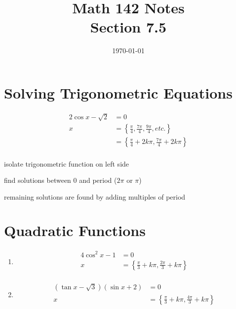 \documentclass{exam}
\title{Math 142 Notes \\ Section 7.5}
\date{\today}
\begin{document}
  \maketitle
  \tableofcontents

  \section{Solving Trigonometric Equations}
  \begin{align*}
    2 \cos x - \sqrt{2} & = 0 \\
    x                   & = \left\{ \frac{\pi}{4}, \frac{7\pi}{4}, \frac{9\pi}{4}, etc. \right\} \\
                        & = \left\{ \frac{\pi}{4} + 2k \pi, \frac{7\pi}{4} + 2k \pi \right\} \\
  \end{align*}

  \begin{itemize*}
    \item isolate trigonometric function on left side
    \item find solutions between 0 and period ($2 \pi$ or $\pi$)
    \item remaining solutions are found by adding multiples of period 
  \end{itemize*}

  \section{Quadratic Functions}
  \begin{enumerate}
    \item 
      \begin{align*}
        4 \cos^2 x - 1 & = 0 \\
        x              & = \left\{ \frac{\pi}{3} + k \pi, \frac{2 \pi}{3} + k \pi \right\} \\
      \end{align*}

    \item
      \begin{align*}
        (\tan x - \sqrt{3})(\sin x + 2) & = 0 \\
        x & = \left\{ \frac{\pi}{3} + k \pi, \frac{4 \pi}{3} + k \pi \right\} \\
      \end{align*}

  \end{enumerate}
\end{document}
